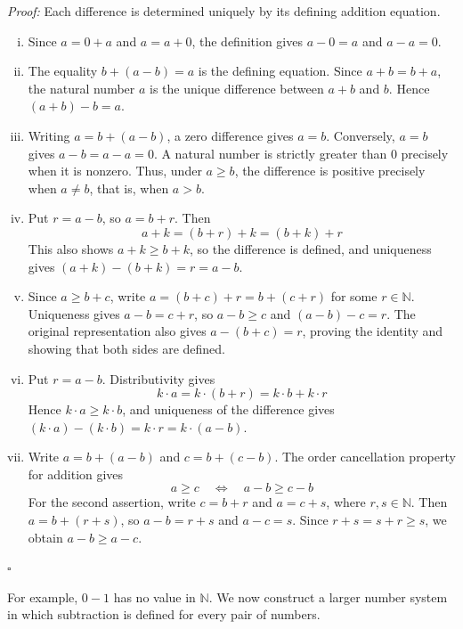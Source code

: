 \documentclass[a4paper,11pt,abstracton]{scrartcl}
\newcommand{\NN}{\mathbb{N}}
\theoremstyle{dotlessP}
\theoremstyle{dotlessS}
\theoremstyle{remark}
\theoremstyle{definition}
\begin{document}
\begin{claim_box}
\textit{Proof:}
Each difference is determined uniquely by its defining addition equation.
\begin{enumerate}[(i)]
    \item Since $a=0+a$ and $a=a+0$, the definition gives $a-0=a$
    and $a-a=0$.

    \item The equality $b+(a-b)=a$ is the defining equation.
    Since $a+b=b+a$, the natural number $a$ is the unique difference
    between $a+b$ and $b$. Hence $(a+b)-b=a$.

    \item Writing $a=b+(a-b)$, a zero difference gives $a=b$.
    Conversely, $a=b$ gives $a-b=a-a=0$. A natural number is strictly
    greater than $0$ precisely when it is nonzero. Thus, under $a\ge b$,
    the difference is positive precisely when $a\ne b$, that is, when
    $a>b$.

    \item Put $r=a-b$, so $a=b+r$. Then
    \[
        a+k=(b+r)+k=(b+k)+r
    \]
    This also shows $a+k\ge b+k$, so the difference is defined, and
    uniqueness gives $(a+k)-(b+k)=r=a-b$.

    \item Since $a\ge b+c$, write $a=(b+c)+r=b+(c+r)$ for some
    $r\in\NN$. Uniqueness gives $a-b=c+r$, so $a-b\ge c$ and
    $(a-b)-c=r$. The original representation also gives
    $a-(b+c)=r$, proving the identity and showing that both sides
    are defined.

    \item Put $r=a-b$. Distributivity gives
    \[
        k\cdot a=k\cdot(b+r)=k\cdot b+k\cdot r
    \]
    Hence $k\cdot a\ge k\cdot b$, and uniqueness of the difference
    gives $(k\cdot a)-(k\cdot b)=k\cdot r=k\cdot(a-b)$.

    \item Write $a=b+(a-b)$ and $c=b+(c-b)$. The order cancellation
    property for addition gives
    \[
        a\ge c\quad\Longleftrightarrow\quad a-b\ge c-b
    \]
    For the second assertion, write $c=b+r$ and $a=c+s$, where
    $r,s\in\NN$. Then $a=b+(r+s)$, so $a-b=r+s$ and $a-c=s$.
    Since $r+s=s+r\ge s$, we obtain $a-b\ge a-c$.
\end{enumerate}
\hfill$\square$
\end{claim_box}

For example, $0-1$ has no value in $\NN$. We now construct a larger
number system in which subtraction is defined for every pair of numbers.
\end{document}
